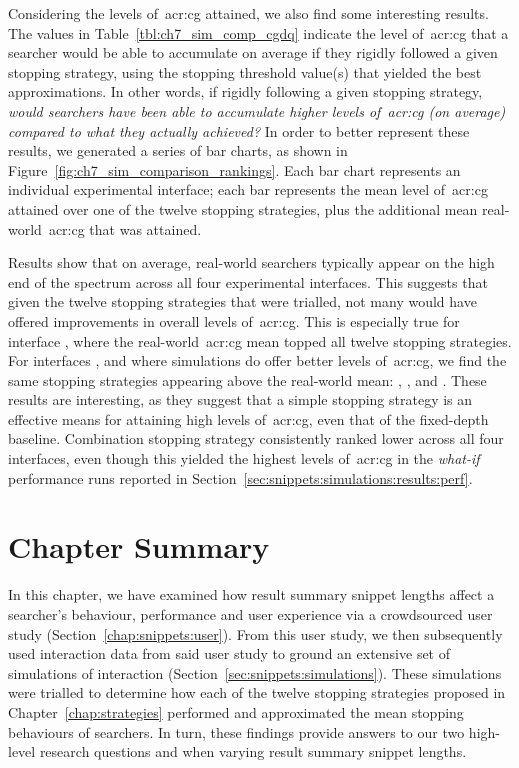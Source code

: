 Considering the levels of~\gls{acr:cg} attained, we also find some interesting results. The values in Table~\ref{tbl:ch7_sim_comp_cgdq} indicate the level of~\gls{acr:cg} that a searcher would be able to accumulate on average if they rigidly followed a given stopping strategy, using the stopping threshold value(s) that yielded the best approximations. In other words, if rigidly following a given stopping strategy, \emph{would searchers have been able to accumulate higher levels of~\gls{acr:cg} (on average) compared to what they actually achieved?} In order to better represent these results, we generated a series of bar charts, as shown in Figure~\ref{fig:ch7_sim_comparison_rankings}. Each bar chart represents an individual experimental interface; each bar represents the mean level of~\gls{acr:cg} attained over one of the twelve stopping strategies, plus the additional mean real-world~\gls{acr:cg} that was attained.

Results show that on average, real-world searchers typically appear on the high end of the spectrum across all four experimental interfaces. This suggests that given the twelve stopping strategies that were trialled, not many would have offered improvements in overall levels of~\gls{acr:cg}. This is especially true for interface , where the real-world~\gls{acr:cg} mean topped all twelve stopping strategies. For interfaces ,  and  where simulations do offer better levels of~\gls{acr:cg}, we find the same stopping strategies appearing above the real-world mean: , ,  and . These results are interesting, as they suggest that a simple stopping strategy is an effective means for attaining high levels of~\gls{acr:cg}, even that of the fixed-depth baseline. Combination stopping strategy  consistently ranked lower across all four interfaces, even though this yielded the highest levels of~\gls{acr:cg} in the \emph{what-if} performance runs reported in Section~\ref{sec:snippets:simulations:results:perf}.

\section{Chapter Summary}
In this chapter, we have examined how result summary snippet lengths affect a searcher's behaviour, performance and user experience via a crowdsourced user study (Section~\ref{chap:snippets:user}). From this user study, we then subsequently used interaction data from said user study to ground an extensive set of simulations of interaction (Section~\ref{sec:snippets:simulations}). These simulations were trialled to determine how each of the twelve stopping strategies proposed in Chapter~\ref{chap:strategies} performed and approximated the mean stopping behaviours of searchers. In turn, these findings provide answers to our two high-level research questions  and  when varying result summary snippet lengths.

